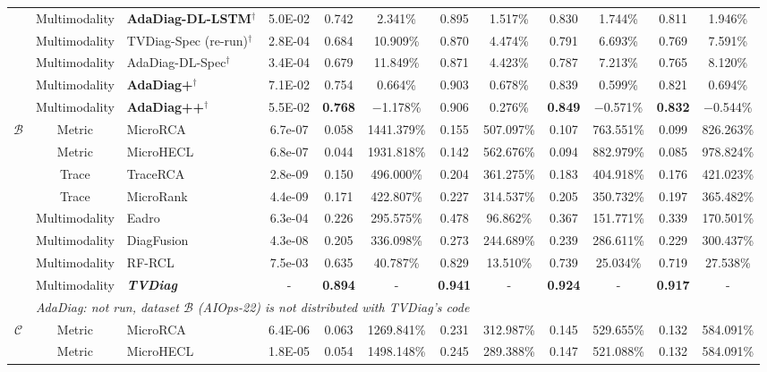 \begin{table}[!ht]
\begin{tabular}{c c l c c c c c c c c c}
 & Multimodality & \textbf{AdaDiag-DL-LSTM}$^\dagger$ & 5.0E-02 & 0.742 & 2.341\% & 0.895 & 1.517\% & 0.830 & 1.744\% & 0.811 & 1.946\% \\
 & Multimodality & TVDiag-Spec (re-run)$^\dagger$ & 2.8E-04 & 0.684 & 10.909\% & 0.870 & 4.474\% & 0.791 & 6.693\% & 0.769 & 7.591\% \\
 & Multimodality & AdaDiag-DL-Spec$^\dagger$ & 3.4E-04 & 0.679 & 11.849\% & 0.871 & 4.423\% & 0.787 & 7.213\% & 0.765 & 8.120\% \\
 & Multimodality & \textbf{AdaDiag+}$^\dagger$ & 7.1E-02 & 0.754 & 0.664\% & 0.903 & 0.678\% & 0.839 & 0.599\% & 0.821 & 0.694\% \\
 & Multimodality & \textbf{AdaDiag++}$^\dagger$ & 5.5E-02 & \textbf{0.768} & $-$1.178\% & 0.906 & 0.276\% & \textbf{0.849} & $-$0.571\% & \textbf{0.832} & $-$0.544\% \\
\midrule
\multirow{9}{*}{$\mathcal{B}$} & Metric & MicroRCA & 6.7e-07 & 0.058 & 1441.379\% & 0.155 & 507.097\% & 0.107 & 763.551\% & 0.099 & 826.263\% \\
 & Metric & MicroHECL & 6.8e-07 & 0.044 & 1931.818\% & 0.142 & 562.676\% & 0.094 & 882.979\% & 0.085 & 978.824\% \\
 & Trace & TraceRCA & 2.8e-09 & 0.150 & 496.000\% & 0.204 & 361.275\% & 0.183 & 404.918\% & 0.176 & 421.023\% \\
 & Trace & MicroRank & 4.4e-09 & 0.171 & 422.807\% & 0.227 & 314.537\% & 0.205 & 350.732\% & 0.197 & 365.482\% \\
 & Multimodality & Eadro & 6.3e-04 & 0.226 & 295.575\% & 0.478 & 96.862\% & 0.367 & 151.771\% & 0.339 & 170.501\% \\
 & Multimodality & DiagFusion & 4.3e-08 & 0.205 & 336.098\% & 0.273 & 244.689\% & 0.239 & 286.611\% & 0.229 & 300.437\% \\
 & Multimodality & RF-RCL & 7.5e-03 & 0.635 & 40.787\% & 0.829 & 13.510\% & 0.739 & 25.034\% & 0.719 & 27.538\% \\
 & Multimodality & \textbf{\textit{TVDiag}} & - & \textbf{0.894} & - & \textbf{0.941} & - & \textbf{0.924} & - & \textbf{0.917} & - \\
 & \multicolumn{11}{l}{\footnotesize\itshape AdaDiag: not run, dataset $\mathcal{B}$ (AIOps-22) is not distributed with TVDiag's code} \\
\midrule
\multirow{18}{*}{$\mathcal{C}$} & Metric & MicroRCA & 6.4E-06 & 0.063 & 1269.841\% & 0.231 & 312.987\% & 0.145 & 529.655\% & 0.132 & 584.091\% \\
 & Metric & MicroHECL & 1.8E-05 & 0.054 & 1498.148\% & 0.245 & 289.388\% & 0.147 & 521.088\% & 0.132 & 584.091\% \\

\end{tabular}
\end{table}
